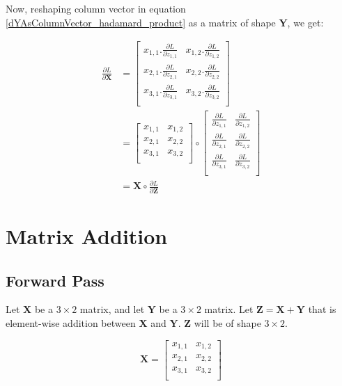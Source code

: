 \documentclass{article}
\newcommand{\matr}[1]{\mathbf{#1}} %
\begin{document}
Now, reshaping column vector in equation \ref{dYAsColumnVector_hadamard_product} as a matrix of shape $\matr{Y}$, we get:

\begin{align}
\frac{\partial L}{\partial \matr{X}} &=
\begin{bmatrix}
x_{1,1}.\frac{\partial L}{\partial z_{1,1}} &
x_{1,2}.\frac{\partial L}{\partial z_{1,2}} \\[0.7em]
x_{2,1}.\frac{\partial L}{\partial z_{2,1}} &
x_{2,2}.\frac{\partial L}{\partial z_{2,2}} \\[0.7em]
x_{3,1}.\frac{\partial L}{\partial z_{3,1}} &
x_{3,2}.\frac{\partial L}{\partial z_{3,2}} \\[0.7em]
\end{bmatrix}
\nonumber \\
&=
\begin{bmatrix}
x_{1,1} & x_{1,2} \\%
x_{2,1} & x_{2,2} \\%
x_{3,1} & x_{3,2} \\%
\end{bmatrix}
\circ
\begin{bmatrix}
\frac{\partial L}{\partial z_{1,1}} & \frac{\partial L}{\partial z_{1,2}} \\[0.5em]
\frac{\partial L}{\partial z_{2,1}} & \frac{\partial L}{\partial z_{2,2}} \\[0.5em]
\frac{\partial L}{\partial z_{3,1}} & \frac{\partial L}{\partial z_{3,2}} \\[0.5em]
\end{bmatrix}
\nonumber \\
&=
\matr{X} \circ \frac{\partial L}{\partial \matr{Z}}
\end{align}

\section{Matrix Addition}
\subsection{Forward Pass}
Let $\matr{X}$ be a $3 \times 2$ matrix, and let $\matr{Y}$ be a $3 \times 2$ matrix. Let $\matr{Z} = \matr{X} + \matr{Y}$ that is element-wise addition between $\matr{X}$ and $\matr{Y}$. $\matr{Z}$ will be of shape $3 \times 2$.

\begin{displaymath}
\matr{X} =
\begin{bmatrix}
x_{1,1} & x_{1,2} \\%
x_{2,1} & x_{2,2} \\%
x_{3,1} & x_{3,2} \\%
\end{bmatrix}
\end{displaymath}
\end{document}
